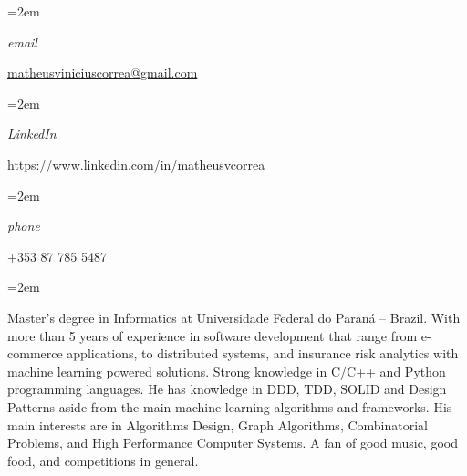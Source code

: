 \documentclass[fontsize=14pt,paper=a4]{scrartcl}
\date{} %
\newcommand{\ProfileInfo}[2]{\noindent\hangindent=2em\hangafter=0
  \parbox{5em}{\small \textit{#1}\hspace{1em}} {\small #2}}
\newcommand{\Description}[1]{\hangindent=2em\hangafter=0\noindent\raggedright\footnotesize{#1}\par\flushleft\normalsize}
\begin{document}
\pagestyle{scrheadings}


\begin{cv}{%
    \noindent%
  } %
  
  
  \vspace{.5em}
  
  \ProfileInfo{email}{\href{mailto:matheusviniciuscorrea@gmail.com}{matheusviniciuscorrea@gmail.com}}

  \ProfileInfo{LinkedIn}{\href{https://www.linkedin.com/in/matheusvcorrea}{https://www.linkedin.com/in/matheusvcorrea}}

  \ProfileInfo{phone}{+353 87 785 5487}
  
  \vspace{1em}

  \noindent{}\vspace{.5em}
  
  \Description{%
    Master's degree in Informatics at Universidade Federal do Paraná --
    Brazil. With more than 5 years of experience in software development that
    range from e-commerce applications, to distributed systems, and insurance
    risk analytics with machine learning powered solutions. Strong knowledge in
    C/C++ and Python programming languages. He has knowledge in DDD, TDD, SOLID and Design
    Patterns aside from the main machine learning algorithms and frameworks. His main interests are in Algorithms Design, Graph Algorithms, Combinatorial Problems, and High Performance Computer Systems. A fan of good music, good food, and competitions in general.%
  }


\end{cv}
\end{document}
